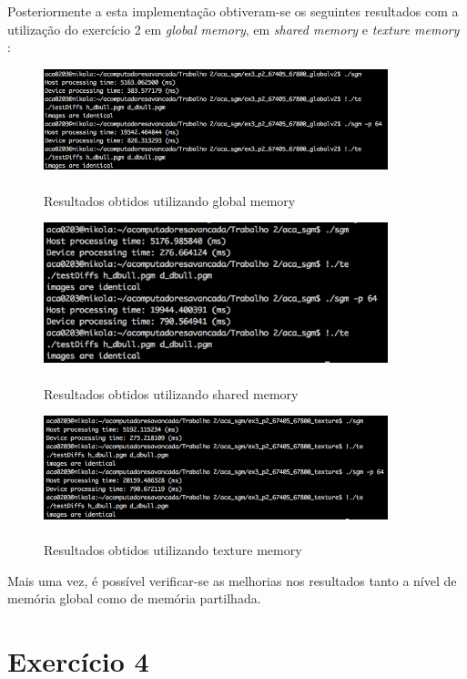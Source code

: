 \documentclass[pdftex,12pt,a4paper]{report}
\begin{document}
Posteriormente a esta implementação obtiveram-se os seguintes resultados com a utilização do exercício 2 em \textit{global memory}, em \textit{shared memory}  e \textit{texture memory} :

\begin{figure}[!htb]
\center
 \includegraphics[width=100mm,scale=1]{inplaceglobal.png}
 \caption{\\ Resultados obtidos utilizando global memory}
 \label{fig:inplaceglobal}
\end{figure}

\begin{figure}[!htb]
\center
 \includegraphics[width=100mm,scale=1]{inplaceshared.png}
 \caption{\\ Resultados obtidos utilizando shared memory}
 \label{fig:inplaceshared}
\end{figure}

\newpage
\begin{figure}[!htb]
\center
 \includegraphics[width=100mm,scale=1]{InplaceSumTexture.png}
 \caption{\\ Resultados obtidos utilizando texture memory}
 \label{fig:InplaceSumTexture}
\end{figure}
 
Mais uma vez, é possível verificar-se as melhorias nos resultados tanto a nível de memória global como de memória partilhada.

\newpage
\section{Exercício 4}
\end{document}
